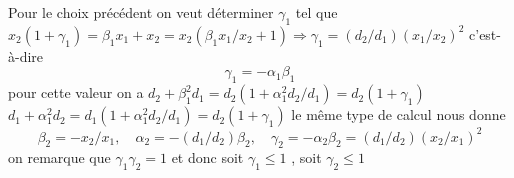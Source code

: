 {\begin{enumerate}
{\begin{itemize}
\end{itemize}
 Pour le choix pr\'ec\'edent on veut d\'eterminer $\gamma_1$ tel que
$x_2(1+\gamma_1)=\beta_1x_1 +x_2 =x_2(\beta_1x_1/x_2 +1) \Rightarrow \gamma_1= (d_2/d_1)(x_1/x_2)^2$ c'est-\`a-dire
$$\gamma_1=-\alpha_1\beta_1$$
pour cette valeur on a
$d_2+\beta_1^2d_1 =d_2(1+\alpha_1^2d_2/d_1) = d_2(1+\gamma_1)$
$d_1+\alpha_1^2d_2 =d_1(1+\alpha_1^2d_2/d_1) = d_2(1+\gamma_1)$
le m\^eme type de calcul nous donne
$$\beta_2=-x_2/x_1, \quad \alpha_2=-(d_1/d_2)\beta_2,\quad \gamma_2=-\alpha_2\beta_2 = (d_1/d_2)(x_2/x_1)^2$$
on remarque que $\gamma_1 \gamma_2=1$ et donc soit $\gamma_1\leq 1$ , soit $\gamma_2\leq 1$
}
\end{enumerate}
}
